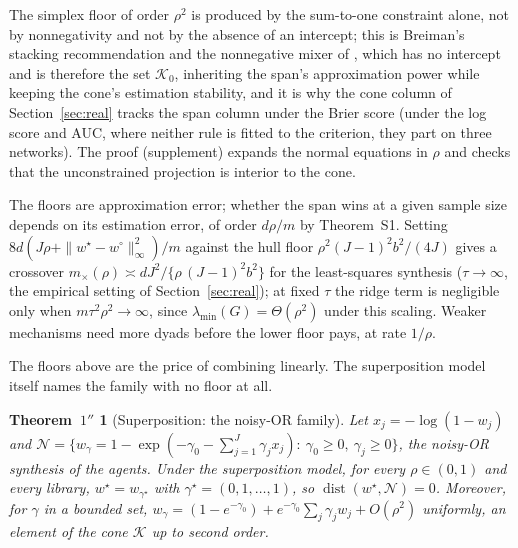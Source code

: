\documentclass[12pt]{article}
\newcommand{\calK}{\mathcal{K}}
\newcommand{\calN}{\mathcal{N}}
\newcommand{\dist}{\operatorname{dist}}
\newcommand{\supn}[1]{\|#1\|_{\infty}}
\newcommand{\wstar}{w^{\star}}
\newcommand{\wproj}{w^{\circ}}
\newtheorem*{thmsecond}{Theorem~$1''$}
\begin{document}
The simplex floor of order $\rho^2$ is produced by the sum-to-one constraint alone, not by nonnegativity and not by the absence of an intercept; this is Breiman's stacking recommendation \citep{Breiman1996} and the nonnegative mixer of \citet{LiLe2024}, which has no intercept and is therefore the set $\calK_0$, inheriting the span's approximation power while keeping the cone's estimation stability, and it is why the cone column of Section~\ref{sec:real} tracks the span column under the Brier score (under the log score and AUC, where neither rule is fitted to the criterion, they part on three networks). The proof (supplement) expands the normal equations in $\rho$ and checks that the unconstrained projection is interior to the cone.

The floors are approximation error; whether the span wins at a given sample size depends on its estimation error, of order $d\rho/m$ by Theorem~S1. Setting $8d(J\rho+\supn{\wstar-\wproj}^2)/m$ against the hull floor $\rho^2(J-1)^2b^2/(4J)$ gives a crossover $m_{\times}(\rho)\asymp dJ^2/\{\rho\,(J-1)^2b^2\}$ for the least-squares synthesis ($\tau\to\infty$, the empirical setting of Section~\ref{sec:real}); at fixed $\tau$ the ridge term is negligible only when $m\tau^2\rho^2\to\infty$, since $\lambda_{\min}(G)=\Theta(\rho^2)$ under this scaling. Weaker mechanisms need more dyads before the lower floor pays, at rate $1/\rho$.

The floors above are the price of combining linearly. The superposition model itself names the family with no floor at all.

\begin{thmsecond}[Superposition: the noisy-OR family]
\label{thm:noisyor}
Let $x_j=-\log(1-w_j)$ and $\calN=\{w_\gamma=1-\exp(-\gamma_0-\sum_{j=1}^{J}\gamma_jx_j):\ \gamma_0\ge0,\ \gamma_j\ge0\}$, the noisy-OR synthesis of the agents. Under the superposition model, for every $\rho\in(0,1)$ and every library, $\wstar=w_{\gamma^\star}$ with $\gamma^\star=(0,1,\dots,1)$, so $\dist(\wstar,\calN)=0$. Moreover, for $\gamma$ in a bounded set, $w_\gamma=(1-e^{-\gamma_0})+e^{-\gamma_0}\sum_j\gamma_jw_j+O(\rho^2)$ uniformly, an element of the cone $\calK$ up to second order.
\end{thmsecond}
\end{document}

